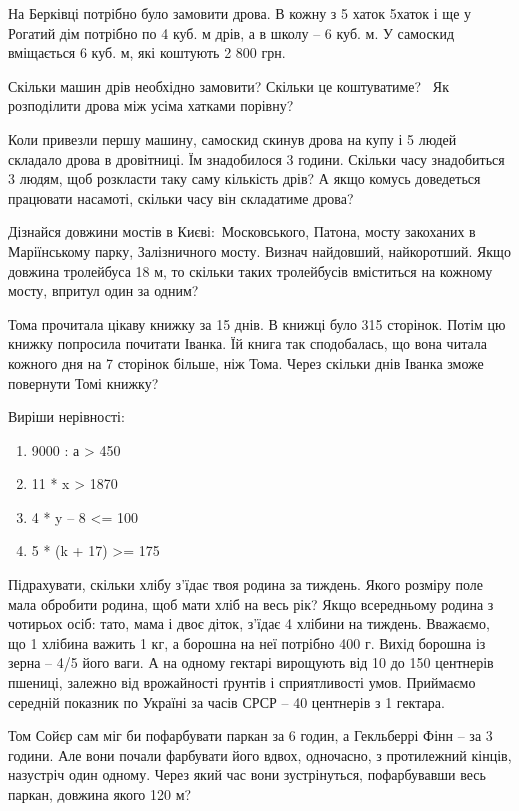 \problem
На Берківці потрібно було замовити дрова.
В кожну з 5 хаток 5хаток і ще у Рогатий дім потрібно по 4 куб. м дрів,
а в школу – 6 куб. м.
У самоскид вміщається 6 куб. м, які коштують 2 800 грн.

Скільки машин дрів необхідно замовити? Скільки це коштуватиме? 
Як розподілити дрова між усіма хатками порівну?

Коли привезли першу машину, самоскид скинув дрова на купу і 5 людей
складало дрова в дровітниці. Їм знадобилося 3 години.
Скільки часу знадобиться 3 людям, щоб розкласти таку саму кількість дрів?
А якщо комусь доведеться працювати насамоті, скільки часу він складатиме дрова?


\problem
Дізнайся довжини мостів в Києві: Московського, Патона,
мосту закоханих в Маріїнському парку, Залізничного мосту.
Визнач найдовший, найкоротший.
Якщо довжина тролейбуса 18 м, то скільки таких тролейбусів
вміститься на кожному мосту, впритул один за одним?


\problem
Тома прочитала цікаву книжку за 15 днів. В книжці було 315 сторінок.
Потім цю книжку попросила почитати Іванка. Їй книга так сподобалась,
що вона читала кожного дня на 7 сторінок більше, ніж Тома.
Через скільки днів Іванка зможе повернути Томі книжку?


\problem
Виріши нерівності:
\begin{multicols}{2}
    \begin{enumerate}
        \item 9000 : а > 450
        \item 11 * x > 1870
        \item 4 * y – 8 <= 100
        \item 5 * (k + 17) >= 175
    \end{enumerate}
\end{multicols}


\problem
Підрахувати, скільки хлібу з’їдає твоя родина за тиждень.
Якого розміру поле мала обробити родина, щоб мати хліб на весь рік?
Якщо всередньому родина з чотирьох осіб: тато, мама і двоє діток,
з’їдає 4 хлібини на тиждень. Вважаємо, що 1 хлібина важить 1 кг,
а борошна на неї потрібно 400 г. Вихід борошна із зерна – 4/5 його ваги.
А на одному гектарі вирощують від 10 до 150 центнерів пшениці,
залежно від врожайності ґрунтів і сприятливості умов.
Приймаємо середній показник по Україні за часів СРСР –
40 центнерів з 1 гектара.


\problem
Том Сойєр сам міг би пофарбувати паркан за 6 годин,
а Гекльберрі Фінн – за 3 години. Але вони почали фарбувати його вдвох,
одночасно, з протилежний кінців, назустріч один одному.
Через який час вони зустрінуться, пофарбувавши весь паркан,
довжина якого 120 м?


